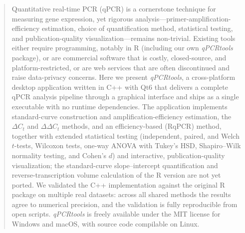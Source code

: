 \begin{abstract}
Quantitative real-time PCR (qPCR) is a cornerstone technique for measuring
gene expression, yet rigorous analysis---primer-amplification-efficiency
estimation, choice of quantification method, statistical testing, and
publication-quality visualization---remains non-trivial. Existing tools
either require programming, notably in R (including our own
\textit{qPCRtools} package), or are commercial software that is costly,
closed-source, and platform-restricted, or are web services that are often
discontinued and raise data-privacy concerns. Here we present
\textit{qPCRtools}, a cross-platform desktop application written in C++
with Qt6 that delivers a complete qPCR analysis pipeline through a
graphical interface and ships as a single executable with no runtime
dependencies. The application implements standard-curve construction and
amplification-efficiency estimation, the $\Delta C_t$ and
$\Delta\Delta C_t$ methods, and an efficiency-based (RqPCR) method, together
with extended statistical testing (independent, paired, and Welch
$t$-tests, Wilcoxon tests, one-way ANOVA with Tukey's HSD, Shapiro--Wilk
normality testing, and Cohen's $d$) and interactive, publication-quality
visualization; the standard-curve slope--intercept quantification and
reverse-transcription volume calculation of the R version are not yet
ported. We validated the C++ implementation against the original R package
on multiple real datasets: across all shared methods the results agree to
numerical precision, and the validation is fully reproducible from open
scripts. \textit{qPCRtools} is freely available under the MIT license for
Windows and macOS, with source code compilable on Linux.
\end{abstract}
